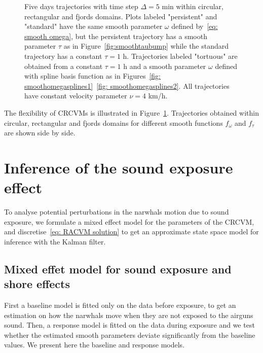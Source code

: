 \documentclass[11pt]{article}
\newcommand {\1}{\mathbb{1}}
\theoremstyle{definition}
\theoremstyle{remark}
\theoremstyle{remark}
\begin{document}
\begin{figure}[H]
 	\caption{Five days trajectories with time step $\Delta=5$ min within circular, rectangular and fjords domains. Plots labeled "persistent" and "standard" have the same smooth parameter $\omega$ defined by~\eqref{eq: smooth omega}, but the persistent trajectory has a smooth parameter $\tau$ as in Figure~\ref{fig:smoothtaubump} while the standard trajectory has a constant $\tau =1$ h. Trajectories labeled "tortuous" are obtained from a constant $\tau=1$ h and a smooth parameter $\omega$ defined with spline basis function as in Figures~\ref{fig: smoothomegasplines1}~\ref{fig: smoothomegasplines2}. All trajectories have constant velocity parameter $\nu=4$ km/h.}
 	\label{fig: crcvm examples}
 \end{figure}

The flexibility of CRCVMs is illustrated in Figure~\ref{fig: crcvm examples}. Trajectories obtained within circular, rectangular and fjords domains for different smooth functions $f_{\omega}$ and $f_{\tau}$ are shown side by side.







\section{Inference of the sound exposure effect}

To analyse potential perturbations in the narwhals motion due to sound exposure, we formulate a mixed effect model for the parameters of the CRCVM, and discretise~\eqref{eq: RACVM solution} to get an approximate state space model for inference with the Kalman filter.


\subsection{Mixed effet model for sound exposure and shore effects}
\label{subsection: ship exposure effect}


First a baseline model is fitted only on the data before exposure, to get an estimation on how the narwhals move when they are not exposed to the airguns sound. Then, a response model is fitted on the data during exposure and we test whether the estimated smooth parameters deviate significantly from the baseline values. We present here the baseline and response models.\\
\end{document}
